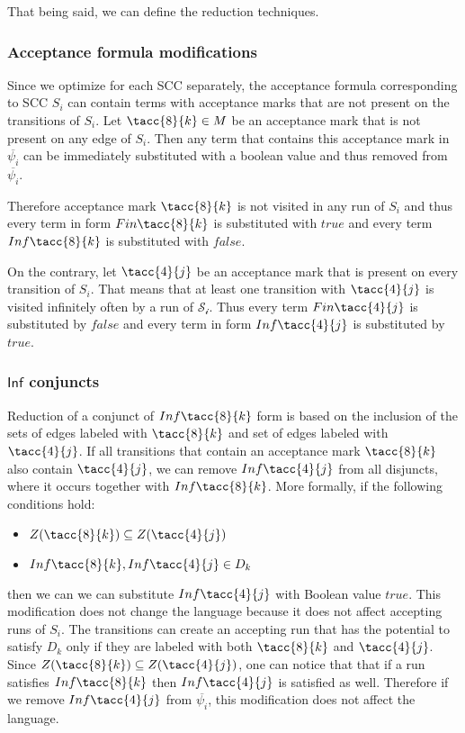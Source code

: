 \documentclass[a4paper,UKenglish,cleveref, autoref, thm-restate]{lipics-v2021}
\def\Inf{\ensuremath{\mathsf{Inf}}}
\def\Fin{\ensuremath{\mathsf{Fin}}}
\def\false{\mathit{false}}
\def\true{\mathit{true}}
\begin{document}
That being said, we can define the reduction techniques. 

\subsubsection{Acceptance formula modifications\\} 
\label{subsection:acc_modif}
Since we optimize for each SCC separately, the acceptance formula corresponding to SCC $S_{i}$ can contain terms with acceptance marks that are not present on the transitions of $S_{i}$.
Let $\tacc{8}{k} \in M$ be an acceptance mark that is not present on any edge of $S_{i}$. Then any term that contains this acceptance mark in $\overline{\psi_{i}}$ can be immediately substituted with a boolean value and thus removed from $\overline{\psi_{i}}$.
\medskip

Therefore acceptance mark $\tacc{8}{k}$ is not visited in any run of $S_{i}$ and thus every term in form $\Fin\tacc{8}{k}$ is substituted with $\true$ and every term $\Inf\tacc{8}{k}$ is substituted with $\false$.

On the contrary, let $\tacc{4}{j}$ be an acceptance mark that is present on every transition of $S_{i}$. That means that at least one transition with $\tacc{4}{j}$ is visited infinitely often by a run of $\mathcal{S_{i}}$. Thus every term $\Fin\tacc{4}{j}$ is substituted by $\false$ and every term in form $\Inf\tacc{4}{j}$ is substituted by $\true$. 

\subsubsection{$\Inf$ conjuncts\\}
\label{subsection:simpl_inf}
Reduction of a conjunct of $\Inf\tacc{8}{k}$ form  is based on the inclusion of the sets of edges labeled with $\tacc{8}{k}$ and set of edges labeled with $\tacc{4}{j}$. If all transitions that contain an acceptance mark $\tacc{8}{k}$ also contain $\tacc{4}{j}$, we can remove $\Inf\tacc{4}{j}$ from all disjuncts, where it occurs together with $\Inf\tacc{8}{k}$. 
More formally, if the following conditions hold:
\begin{itemize}
    \item $Z(\tacc{8}{k}) \subseteq Z(\tacc{4}{j})$
    \item $\Inf\tacc{8}{k}, \Inf\tacc{4}{j} \in D_{k}$
\end{itemize}
then we can we can substitute $\Inf\tacc{4}{j}$ with Boolean value $\true$. 
This modification does not change the language because it does not affect accepting runs of $S_{i}$. The transitions can create an accepting run that has the potential to satisfy $D_{k}$ only if they are labeled with both  $\tacc{8}{k}$  and $\tacc{4}{j}$. Since $Z(\tacc{8}{k}) \subseteq Z(\tacc{4}{j})$, one can notice that that if a run satisfies $\Inf\tacc{8}{k}$ then  $\Inf\tacc{4}{j}$ is satisfied as well. Therefore if we remove $\Inf \tacc{4}{j}$ from $\overline{\psi_{i}}$, this modification does not affect the language.
\end{document}
